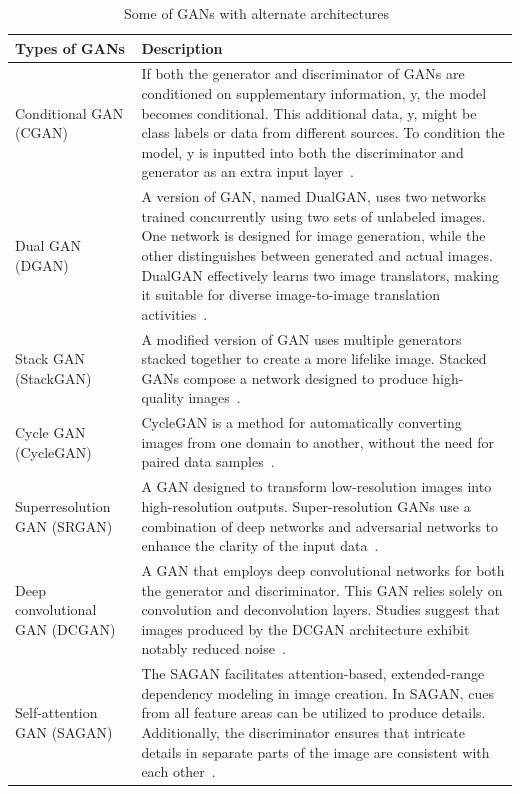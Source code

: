 \begin{table}[htpb]
	\caption{Some of \ac{GAN}s with alternate architectures~\cite{gans-versions,wikipedia-gans}}\label{tab:gans}
	\centering
	\small
	\begin{tabularx}{\textwidth}{l X}
		\toprule
		\textbf{Types of \ac{GAN}s}    & \textbf{Description}                                                \\
		\midrule
		Conditional GAN (CGAN)         & If both the generator and discriminator of
		\ac{GAN}s are conditioned on supplementary information, y, the model becomes
		conditional. This additional data, y, might be class labels or data from
		different sources. To condition the model, y is inputted
		into both the discriminator and generator as an extra input
		layer~\cite{mirza2014conditional}.                                                                   \\
		\addlinespace
		Dual GAN (DGAN)                & A version of \ac{GAN}, named DualGAN,
		uses two networks trained concurrently using two sets of unlabeled images.
		One network is designed for image generation, while the other distinguishes
		between generated and actual images. DualGAN effectively learns two image translators,
		making it suitable for diverse image-to-image translation activities~\cite{yi2018dualgan}.           \\
		\addlinespace
		Stack GAN (StackGAN)           & A modified version of \ac{GAN} uses multiple generators
		stacked together to create a more lifelike image. Stacked \ac{GAN}s compose a
		network designed to produce high-quality images~\cite{zhang2017stackgan}.                            \\
		\addlinespace
		Cycle GAN (CycleGAN)           & CycleGAN is a method for automatically converting
		images from one domain to another, without the need for paired data samples~\cite{zhu2020unpaired}.  \\
		\addlinespace
		Superresolution GAN (SRGAN)    & A \ac{GAN} designed to transform low-resolution images into
		high-resolution outputs. Super-resolution \ac{GAN}s use a combination of deep networks
		and adversarial networks to enhance the clarity of the input data~\cite{ledig2017photorealistic}.    \\
		\addlinespace
		Deep convolutional GAN (DCGAN) & A \ac{GAN} that employs deep convolutional networks
		for both the generator and discriminator. This \ac{GAN} relies solely on convolution
		and deconvolution layers. Studies suggest that images produced by the DCGAN
		architecture exhibit notably reduced noise~\cite{radford2016unsupervised}.                           \\
		\addlinespace
		Self-attention GAN (SAGAN)     & The SAGAN facilitates attention-based, extended-range
		dependency modeling in image creation. In SAGAN, cues from all feature areas can
		be utilized to produce details. Additionally, the discriminator ensures that intricate
		details in separate parts of the image are consistent with each other~\cite{zhang2019selfattention}. \\
		\bottomrule
	\end{tabularx}
\end{table}

